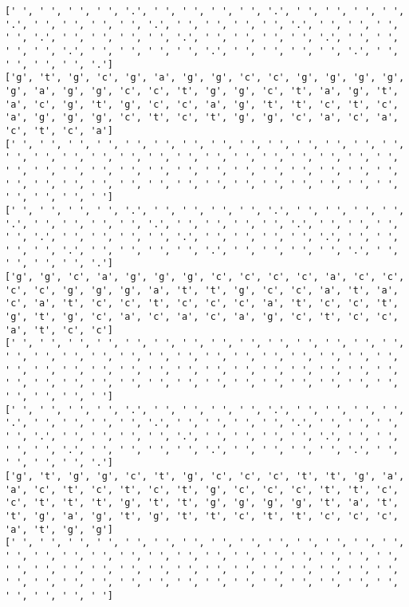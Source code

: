 \documentclass{article}
\begin{document}
\begin{Verbatim}
[' ', ' ', ' ', ' ', '.', ' ', ' ', ' ', ' ', '.', ' ', ' ', ' ', ' ', '.', ' ', ' ', ' ', ' ', '.', ' ', ' ', ' ', ' ', '.', ' ', ' ', ' ', ' ', '.', ' ', ' ', ' ', ' ', '.', ' ', ' ', ' ', ' ', '.', ' ', ' ', ' ', ' ', '.', ' ', ' ', ' ', ' ', '.', ' ', ' ', ' ', ' ', '.', ' ', ' ', ' ', ' ', '.']
['g', 't', 'g', 'c', 'g', 'a', 'g', 'g', 'c', 'c', 'g', 'g', 'g', 'g', 'g', 'a', 'g', 'g', 'c', 'c', 't', 'g', 'g', 'c', 't', 'a', 'g', 't', 'a', 'c', 'g', 't', 'g', 'c', 'c', 'a', 'g', 't', 't', 'c', 't', 'c', 'a', 'g', 'g', 'g', 'c', 't', 'c', 't', 'g', 'g', 'c', 'a', 'c', 'a', 'c', 't', 'c', 'a']
[' ', ' ', ' ', ' ', ' ', ' ', ' ', ' ', ' ', ' ', ' ', ' ', ' ', ' ', ' ', ' ', ' ', ' ', ' ', ' ', ' ', ' ', ' ', ' ', ' ', ' ', ' ', ' ', ' ', ' ', ' ', ' ', ' ', ' ', ' ', ' ', ' ', ' ', ' ', ' ', ' ', ' ', ' ', ' ', ' ', ' ', ' ', ' ', ' ', ' ', ' ', ' ', ' ', ' ', ' ', ' ', ' ', ' ', ' ', ' ']
[' ', ' ', ' ', ' ', '.', ' ', ' ', ' ', ' ', '.', ' ', ' ', ' ', ' ', '.', ' ', ' ', ' ', ' ', '.', ' ', ' ', ' ', ' ', '.', ' ', ' ', ' ', ' ', '.', ' ', ' ', ' ', ' ', '.', ' ', ' ', ' ', ' ', '.', ' ', ' ', ' ', ' ', '.', ' ', ' ', ' ', ' ', '.', ' ', ' ', ' ', ' ', '.', ' ', ' ', ' ', ' ', '.']
['g', 'g', 'c', 'a', 'g', 'g', 'g', 'c', 'c', 'c', 'c', 'a', 'c', 'c', 'c', 'c', 'g', 'g', 'g', 'a', 't', 't', 'g', 'c', 'c', 'a', 't', 'a', 'c', 'a', 't', 'c', 'c', 't', 'c', 'c', 'c', 'a', 't', 'c', 'c', 't', 'g', 't', 'g', 'c', 'a', 'c', 'a', 'c', 'a', 'g', 'c', 't', 'c', 'c', 'a', 't', 'c', 'c']
[' ', ' ', ' ', ' ', ' ', ' ', ' ', ' ', ' ', ' ', ' ', ' ', ' ', ' ', ' ', ' ', ' ', ' ', ' ', ' ', ' ', ' ', ' ', ' ', ' ', ' ', ' ', ' ', ' ', ' ', ' ', ' ', ' ', ' ', ' ', ' ', ' ', ' ', ' ', ' ', ' ', ' ', ' ', ' ', ' ', ' ', ' ', ' ', ' ', ' ', ' ', ' ', ' ', ' ', ' ', ' ', ' ', ' ', ' ', ' ']
[' ', ' ', ' ', ' ', '.', ' ', ' ', ' ', ' ', '.', ' ', ' ', ' ', ' ', '.', ' ', ' ', ' ', ' ', '.', ' ', ' ', ' ', ' ', '.', ' ', ' ', ' ', ' ', '.', ' ', ' ', ' ', ' ', '.', ' ', ' ', ' ', ' ', '.', ' ', ' ', ' ', ' ', '.', ' ', ' ', ' ', ' ', '.', ' ', ' ', ' ', ' ', '.', ' ', ' ', ' ', ' ', '.']
['g', 't', 'g', 'g', 'c', 't', 'g', 'c', 'c', 'c', 't', 't', 'g', 'a', 'a', 'c', 't', 'c', 't', 'c', 't', 'g', 'c', 'c', 'c', 't', 't', 'c', 'c', 't', 't', 't', 'g', 't', 't', 'g', 'g', 'g', 'g', 't', 'a', 't', 't', 'g', 'a', 'g', 't', 'g', 't', 't', 'c', 't', 't', 'c', 'c', 'c', 'a', 't', 'g', 'g']
[' ', ' ', ' ', ' ', ' ', ' ', ' ', ' ', ' ', ' ', ' ', ' ', ' ', ' ', ' ', ' ', ' ', ' ', ' ', ' ', ' ', ' ', ' ', ' ', ' ', ' ', ' ', ' ', ' ', ' ', ' ', ' ', ' ', ' ', ' ', ' ', ' ', ' ', ' ', ' ', ' ', ' ', ' ', ' ', ' ', ' ', ' ', ' ', ' ', ' ', ' ', ' ', ' ', ' ', ' ', ' ', ' ', ' ', ' ', ' ']

\end{Verbatim}
\end{document}
